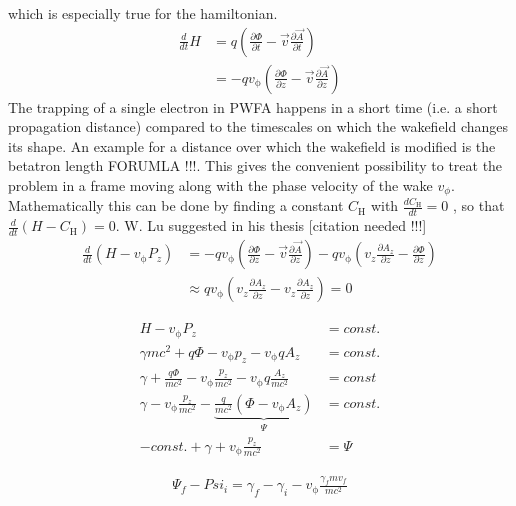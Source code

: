 \documentclass{thesis}
\begin{document}
which is especially true for the hamiltonian.
\begin{align*}
\frac{d}{dt}H&=q(\frac{\partial \Phi}{\partial t}-\vec{v}\frac{\partial \vec{A}}{\partial t})\\
&=-q v_\mathrm{\phi}(\frac{\partial \Phi}{\partial z}-\vec{v} \frac{\partial \vec{A}}{\partial z})
\end{align*}
The trapping of a single electron in PWFA happens in a short time (i.e. a short propagation distance) compared to the timescales on which the wakefield changes its shape. An example for a distance over which the wakefield is modified is the betatron length FORUMLA !!!.
This gives the convenient possibility to treat the problem in a frame moving along with the phase velocity of the wake $v_\phi$. Mathematically this can be done by finding a constant $C_\mathrm{H}$ with $\frac{d C_\mathrm{H}}{dt}=0$ , so that $\frac{d}{dt}(H-C_\mathrm{H})=0$.
W. Lu suggested in his thesis [citation needed !!!] 
\begin{align*}
\frac{d}{dt}(H-v_\mathrm{\phi} P_z)&=-qv_\mathrm{\phi}(\frac{\partial \Phi}{\partial z}-\vec{v}\frac{\partial \vec{A}}{\partial z})-qv_\mathrm{\phi}(v_z \frac{\partial A_z}{\partial z}-\frac{\partial \Phi}{\partial z})\\
&\approx q v_\mathrm{\phi}(v_z \frac{\partial A_z}{\partial z}-v_z \frac{\partial A_z}{\partial z})=0
\end{align*}

\begin{align*}
H-v_\mathrm{\phi}P_z&=const.\\
\gamma m c^2+q\Phi-v_\mathrm{\phi}p_z-v_\mathrm{\phi}qA_z&=const.\\
\gamma+\frac{q\Phi}{mc^2}-v_\mathrm{\phi}\frac{p_z}{mc^2}-v_\mathrm{\phi}q\frac{A_z}{mc^2}&=const\\
\gamma-v_\mathrm{\phi}\frac{p_z}{mc^2}-\underbrace{\frac{q}{mc^2}(\Phi-v_\mathrm{\phi}A_z)}_{\Psi}&=const.\\
-const. +\gamma + v_\mathrm{\phi}\frac{p_z}{mc^2}&=\Psi
\end{align*}

\begin{align*}
\Psi_f-Psi_i=\gamma_f-\gamma_i-v_\mathrm{\phi}\frac{\gamma_f m v_f}{mc^2}
\end{align*}


    
\end{document}
